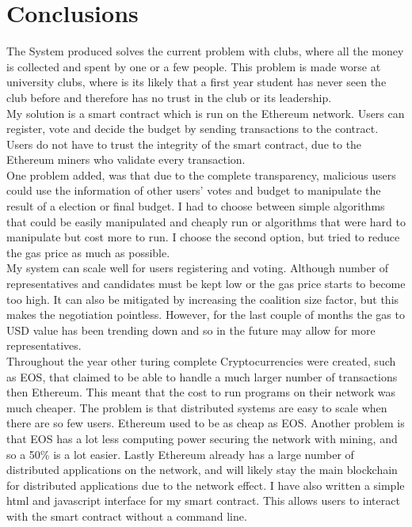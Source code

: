 \chapter{Conclusions} \label{Chapter: Conclusions}
The System produced solves the current problem with clubs, where all the money is collected and spent by one or a few people. This problem is made worse at university clubs, where is its likely that a first year student has never seen the club before and therefore has no trust in the club or its leadership.  \\
My solution is a smart contract which is run on the Ethereum network. Users can register, vote and decide the budget by sending transactions to the contract. Users do not have to trust the integrity of the smart contract, due to the Ethereum miners who validate every transaction. \\
One problem added, was that due to the complete transparency, malicious users could use the information of other users' votes and budget to manipulate the result of a election or final budget. I had to choose between simple algorithms that could be easily manipulated and cheaply run or algorithms that were hard to manipulate but cost more to run. I choose the second option, but tried to reduce the gas price as much as possible. \\
My system can scale well for users registering and voting. Although number of representatives and candidates must be kept low or the gas price starts to become too high. It can also be mitigated by increasing the coalition size factor, but this makes the negotiation pointless. However, for the last couple of months the gas to USD value has been trending down and so in the future may allow for more representatives. \\
Throughout the year other turing complete Cryptocurrencies were created, such as EOS, that claimed to be able to handle a much larger number of transactions then Ethereum. This meant that the cost to run programs on their network was much cheaper. The problem is that distributed systems are easy to scale when there are so few users. Ethereum used to be as cheap as EOS. Another problem is that EOS has a lot less computing power securing the network with mining, and so a 50\% is a lot easier. Lastly Ethereum already has a large number of distributed applications on the network, and will likely stay the main blockchain for distributed applications due to the network effect. 
I have also written a simple html and javascript interface for my smart contract. This allows users to interact with the smart contract without a command line. 
